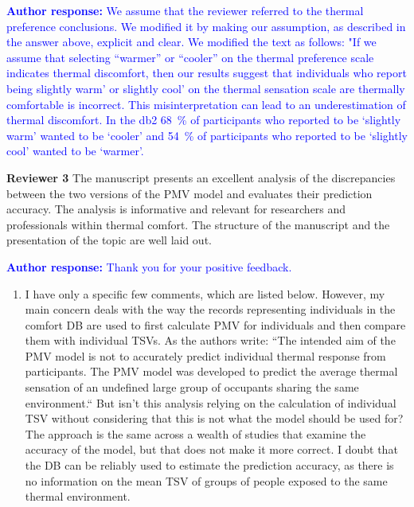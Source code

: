 \documentclass[a4paper, 10pt]{letter}
\newcommand{\response}[1]{\textcolor{blue}{\textbf{Author response:} #1}}
\begin{document}
\begin{letter}
\begin{enumerate}
            \response{
            We assume that the reviewer referred to the thermal preference conclusions. 
            We modified it by making our assumption, as described in the answer above, explicit and clear. 
            We modified the text as follows: "If we assume that selecting “warmer” or “cooler” on the thermal preference scale indicates thermal discomfort, then our results suggest that individuals who report being slightly warm' or slightly cool’ on the thermal sensation scale are thermally comfortable is incorrect. 
            This misinterpretation can lead to an underestimation of thermal discomfort. 
            In the \ac{db2} \qty{68}{\percent} of participants who reported to be `slightly warm' wanted to be `cooler' and \qty{54}{\percent} of participants who reported to be `slightly cool' wanted to be `warmer'.}

        \end{enumerate}

        \clearpage

        \textbf{Reviewer 3}
        The manuscript presents an excellent analysis of the discrepancies between the two versions of the PMV model and evaluates their prediction accuracy.
        The analysis is informative and relevant for researchers and professionals within thermal comfort.
        The structure of the manuscript and the presentation of the topic are well laid out.

        \response{
            Thank you for your positive feedback.
        }

        \begin{enumerate}
            \item I have only a specific few comments, which are listed below.
            However, my main concern deals with the way the records representing individuals in the comfort DB are used to first calculate PMV for individuals and then compare them with individual TSVs.
            As the authors write: ``The intended aim of the PMV model is not to accurately predict individual thermal response from participants.
            The PMV model was developed to predict the average thermal sensation of an undefined large group of occupants sharing the same environment.``
            But isn't this analysis relying on the calculation of individual TSV without considering that this is not what the model should be used for?
            The approach is the same across a wealth of studies that examine the accuracy of the model, but that does not make it more correct.
            I doubt that the DB can be reliably used to estimate the prediction accuracy, as there is no information on the mean TSV of groups of people exposed to the same thermal environment.


\end{enumerate}
\end{letter}
\end{document}
